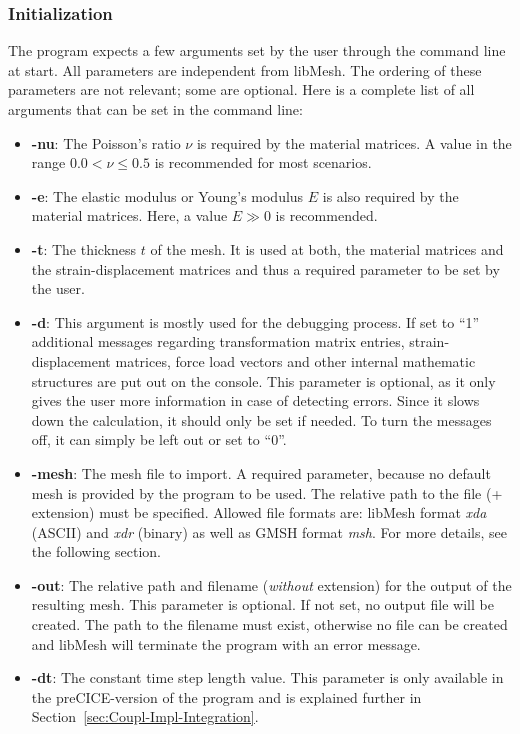   \subsubsection{Initialization}\label{sec:Impl-Details-Init}
  The program expects a few arguments set by the user through the command line at start. All parameters are independent from libMesh. The ordering of these parameters are not relevant; some are optional. Here is a complete list of all arguments that can be set in the command line:
  \begin{itemize}
  	\item \textbf{-nu}: The Poisson's ratio $\nu$ is required by the material matrices. A value in the range $0.0 < \nu \leq 0.5$ is recommended for most scenarios.
  	\item \textbf{-e}: The elastic modulus or Young's modulus $E$ is also required by the material matrices. Here, a value $E \gg 0$ is recommended.
  	\item \textbf{-t}: The thickness $t$ of the mesh. It is used at both, the material matrices and the strain-displacement matrices and thus a required parameter to be set by the user.
  	\item \textbf{-d}: This argument is mostly used for the debugging process. If set to ``1'' additional messages regarding transformation matrix entries, strain-displacement matrices, force load vectors and other internal mathematic structures are put out on the console. This parameter is optional, as it only gives the user more information in case of detecting errors. Since it slows down the calculation, it should only be set if needed. To turn the messages off, it can simply be left out or set to ``0''.
  	\item \textbf{-mesh}: The mesh file to import. A required parameter, because no default mesh is provided by the program to be used. The relative path to the file (+ extension) must be specified. Allowed file formats are: libMesh format \textit{xda} (ASCII) and \textit{xdr} (binary) as well as GMSH format \textit{msh}. For more details, see the following section.
  	\item \textbf{-out}: The relative path and filename (\textit{without} extension) for the output of the resulting mesh. This parameter is optional. If not set, no output file will be created. The path to the filename must exist, otherwise no file can be created and libMesh will terminate the program with an error message.
  	\item \textbf{-dt}: The constant time step length value. This parameter is only available in the preCICE-version of the program and is explained further in Section~\ref{sec:Coupl-Impl-Integration}.
  \end{itemize}
  
